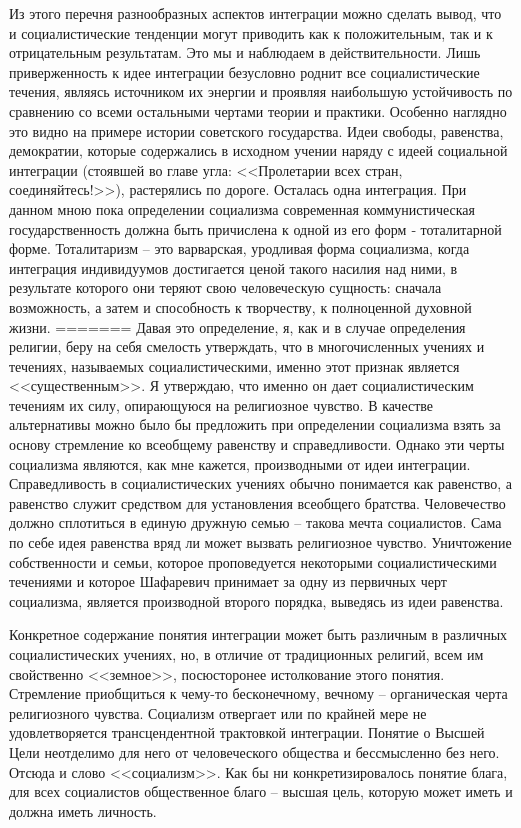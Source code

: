 \documentclass{book}
\begin{document}
Из этого перечня разнообразных аспектов интеграции можно сделать вывод, что и социалистические тенденции могут при­водить как к положительным, так и к отрицательным резуль­татам. Это мы и наблюдаем в действительности. Лишь привер­женность к идее интеграции безусловно роднит все социали­стические течения, являясь источником их энергии и проявляя наибольшую устойчивость по сравнению со всеми остальными чертами теории и практики. Особенно наглядно это видно на примере истории советского государства. Идеи свободы, ра­венства, демократии, которые содержались в исходном учении наряду с идеей социальной интеграции (стоявшей во главе угла: <<Пролетарии всех стран, соединяйтесь!>>), растерялись по доро­ге. Осталась одна интеграция. При данном мною пока опреде­лении социализма современная коммунистическая государст­венность должна быть причислена к одной из его форм ‑ тота­литарной форме. Тоталитаризм -- это варварская, уродливая форма социализма, когда интеграция индивидуумов достига­ется ценой такого насилия над ними, в результате которого они теряют свою человеческую сущность: сначала возможность, а затем и способность к творчеству, к полноценной духовной жизни.
=======
Давая это определение, я, как и в случае определения религии, беру на себя смелость утверждать, что в многочисленных учениях и течениях, называемых социалистическими, именно этот признак является <<существенным>>. Я утверждаю, что именно он дает социалистическим течениям их силу, опираю­щуюся на религиозное чувство. В качестве альтернативы можно было бы предложить при определении социализма взять за основу стремление ко всеобщему равенству и справедли­вости. Однако эти черты социализма являются, как мне кажется, производными от идеи интеграции. Справедливость в социалистических учениях обычно понимается как равенство, а равенство служит средством для установления всеобщего братства. Человечество должно сплотиться в единую дружную семью -- такова мечта социалистов. Сама по себе идея равенст­ва вряд ли может вызвать религиозное чувство. Уничтожение собственности и семьи, которое проповедуется некоторыми социалистическими течениями и которое Шафаревич прини­мает за одну из первичных черт социализма, является 
произ­водной второго порядка, выведясь из идеи равенства.

Конкретное содержание понятия интеграции может быть различным в различных социалистических учениях, но, в отли­чие от традиционных религий, всем им свойственно <<земное>>, посюсторонее истолкование этого понятия. Стремление приоб­щиться к чему-то бесконечному, вечному -- органическая чер­та религиозного чувства. Социализм отвергает или по край­ней мере не удовлетворяется трансцендентной трактовкой ин­теграции. Понятие о Высшей Цели неотделимо для него от че­ловеческого общества и бессмысленно без него. Отсюда и слово <<социализм>>. Как бы ни конкретизировалось понятие блага, для всех социалистов общественное благо -- высшая цель, ко­торую может иметь и должна иметь личность.
\end{document}
